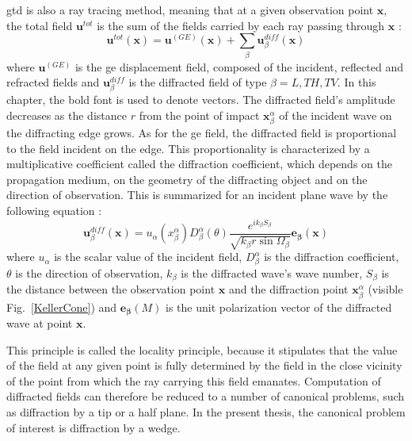 \acrshort{gtd} is also a ray tracing method, meaning that at a given observation point $\mathbf{x}$, the total field $\mathbf{u}^{tot}$ is the sum of the fields carried by each ray passing through $\mathbf{x}$ :
\begin{equation}
    \mathbf{u}^{tot}(\mathbf{x})=\mathbf{u}^{(GE)}(\mathbf{x})+\sum_{\beta} \mathbf{u}^{diff}_{\beta}(\mathbf{x})
    \label{GTDtot}
\end{equation}
where $\mathbf{u}^{(GE)}$ is the \acrshort{ge} displacement field, composed of the incident, reflected and refracted fields and $\mathbf{u}^{diff}_{\beta}$ is the diffracted field of type $\beta=L,TH,TV$. In this chapter, the bold font is used to denote vectors. The diffracted field's amplitude decreases as the distance $r$ from the point of impact $\mathbf{x}_{\beta}^{\alpha}$ of the incident wave on the diffracting edge grows. As for the \acrshort{ge} field, the diffracted field is proportional to the field incident on the edge. This proportionality is characterized by a multiplicative coefficient called the diffraction coefficient, which depends on the propagation medium, on the geometry of the diffracting object and on the direction of observation. This is summarized for an incident plane wave by the following equation :
\begin{equation}
    \mathbf{u}_{\beta}^{diff}(\mathbf{x})=u_{\alpha}(x_{\beta}^{\alpha})D_{\beta}^{\alpha}(\theta)\dfrac{e^{ik_{\beta}S_{\beta}}}{\sqrt{k_{\beta}r\sin\Omega_{\beta}}}\mathbf{e_{\beta}}(\mathbf{x})
    \label{C1:GTDdiff}
\end{equation}
where $u_{\alpha}$ is the scalar value of the incident field, $D_{\beta}^{\alpha}$ is the diffraction coefficient, $\theta$ is the direction of observation, $k_{\beta}$ is the diffracted wave's wave number, $S_{\beta}$ is the distance between the observation point $\mathbf{x}$ and the diffraction point $\mathbf{x}_{\beta}^{\alpha}$ (visible Fig.~\ref{KellerCone}) and $\mathbf{e_{\beta}}(M)$ is the unit polarization vector of the diffracted wave at point $\mathbf{x}$.

This principle is called the locality principle, because it stipulates that the value of the field at any given point is fully determined by the field in the close vicinity of the point from which the ray carrying this field emanates. Computation of diffracted fields can therefore be reduced to a number of canonical problems, such as diffraction by a tip or a half plane. In the present thesis, the canonical problem of interest is diffraction by a wedge.

